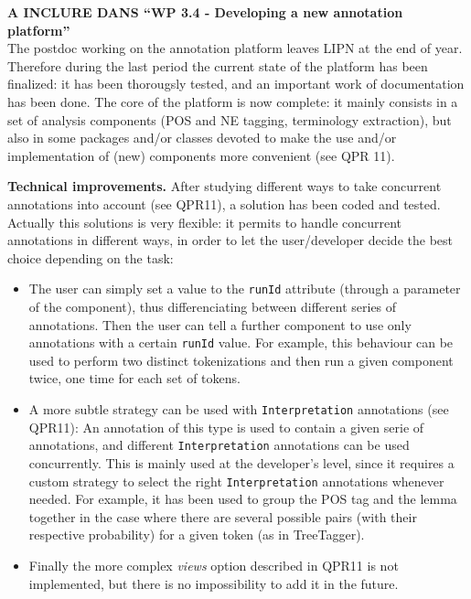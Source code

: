 \newcommand{\todo}[1]{{\bf [TODO #1]}}

{\bf A INCLURE DANS ``WP 3.4 - Developing a new annotation platform''}\\

The postdoc working on the annotation platform leaves LIPN at the end of year. Therefore during the last period the current state of the platform has been finalized: it has been thorougsly tested, and an important work of  documentation has been done. The core of the platform is now complete: it mainly consists in a set of analysis components (POS and NE tagging, terminology extraction), but also in some packages and/or classes devoted to make the use and/or implementation of (new) components more convenient (see QPR 11).
\medskip

{\bf Technical improvements.} After studying different ways to take concurrent annotations into account (see QPR11), a solution has been coded and tested. Actually this solutions is very flexible: it permits to handle concurrent annotations in different ways, in order to let the user/developer decide the best choice depending on the task:

\begin{itemize}
\item The user can simply set a value to the {\tt runId} attribute (through a parameter of the component), thus differenciating between different series of annotations. Then the user can tell a further component to use only annotations with a certain {\tt runId} value. For example, this behaviour can be used to perform two distinct tokenizations and then run a given component twice, one time for each set of tokens.
\item A more subtle strategy can be used with {\tt Interpretation} annotations (see QPR11): An annotation of this type is used to contain a given serie of annotations, and different {\tt Interpretation} annotations can be used concurrently. This is mainly used at the developer's level, since it requires a custom strategy to select the right {\tt Interpretation} annotations whenever needed. For example, it has been used to group the POS tag and the lemma together in the case where there are several possible pairs (with their respective probability) for a given token (as in TreeTagger).

\item Finally the more complex {\em views} option described in QPR11 is not implemented, but there is no impossibility to add it in the future.
\end{itemize}

